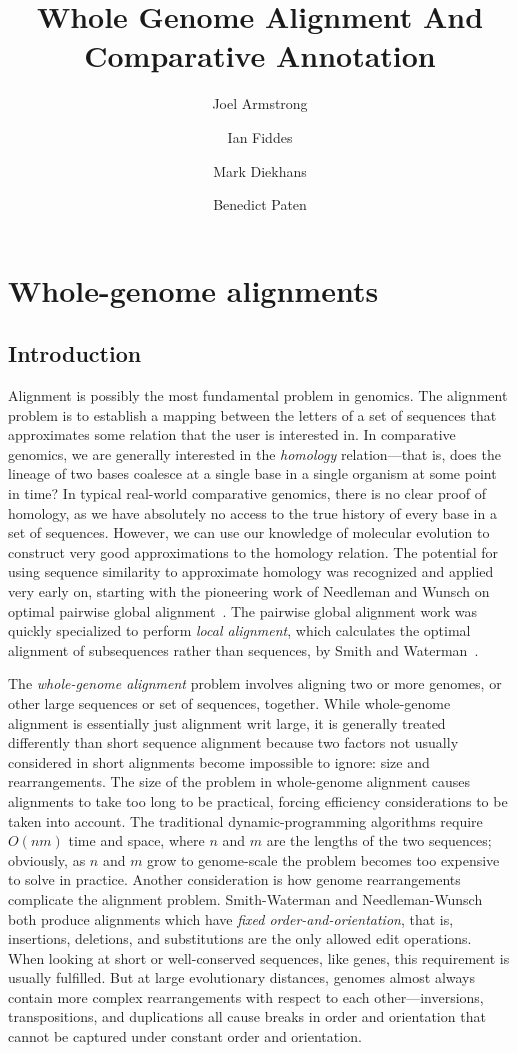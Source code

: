 \documentclass[fleqn,10pt]{wlscirep}
\title{Whole Genome Alignment And Comparative Annotation}
\author[1,*]{Joel Armstrong}
\author[1,*]{Ian Fiddes}
\author[1,]{Mark Diekhans}
\author[1,+]{Benedict Paten}
\affil[1]{Genomics Institute, University of California Santa Cruz and Howard Hughes Medical Institute, Santa Cruz, CA 95064, USA}
\affil[+]{Corresponding author. Email: bpaten@ucsc.edu}
\affil[*]{these authors contributed equally to this work}
\begin{document}
\flushbottom
\maketitle

\pagestyle{plain}

\section{Whole-genome alignments}
\subsection{Introduction}
Alignment is possibly the most fundamental problem in genomics.
The alignment problem is to establish a mapping between the letters of a set of sequences that approximates some relation that the user is interested in.
In comparative genomics, we are generally interested in the \emph{homology} relation---that is, does the lineage of two bases coalesce at a single base in a single organism at some point in time?
In typical real-world comparative genomics, there is no clear proof of homology, as we have absolutely no access to the true history of every base in a set of sequences.
However, we can use our knowledge of molecular evolution to construct very good approximations to the homology relation.
The potential for using sequence similarity to approximate homology was recognized and applied very early on, starting with the pioneering work of Needleman and Wunsch on optimal pairwise global alignment~\cite{Needleman1970443}.
The pairwise global alignment work was quickly specialized to perform \emph{local alignment}, which calculates the optimal alignment of subsequences rather than sequences, by Smith and Waterman~\cite{Smith1981}.

The \emph{whole-genome alignment} problem involves aligning two or more genomes, or other large sequences or set of sequences, together.
While whole-genome alignment is essentially just alignment writ large, it is generally treated differently than short sequence alignment because two factors not usually considered in short alignments become impossible to ignore: size and rearrangements.
The size of the problem in whole-genome alignment causes alignments to take too long to be practical, forcing efficiency considerations to be taken into account.
The traditional dynamic-programming algorithms require $O(nm)$ time and space, where $n$ and $m$ are the lengths of the two sequences; obviously, as $n$ and $m$ grow to genome-scale the problem becomes too expensive to solve in practice.
Another consideration is how genome rearrangements complicate the alignment problem.
Smith-Waterman and Needleman-Wunsch both produce alignments which have \emph{fixed order-and-orientation}, that is, insertions, deletions, and substitutions are the only allowed edit operations.
When looking at short or well-conserved sequences, like genes, this requirement is usually fulfilled.
But at large evolutionary distances, genomes almost always contain more complex rearrangements with respect to each other---inversions, transpositions, and duplications all cause breaks in order and orientation that cannot be captured under constant order and orientation.
\end{document}
